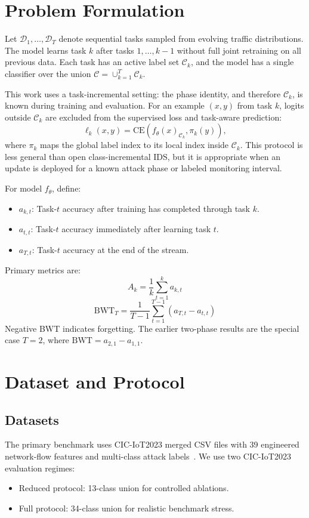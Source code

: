 \documentclass[a4paper,fleqn]{cas-dc}
\begin{document}
\section{Problem Formulation}
Let $\mathcal{D}_1,\ldots,\mathcal{D}_T$ denote sequential tasks sampled from evolving traffic distributions. The model learns task $k$ after tasks $1,\ldots,k-1$ without full joint retraining on all previous data. Each task has an active label set $\mathcal{C}_k$, and the model has a single classifier over the union $\mathcal{C}=\cup_{k=1}^{T}\mathcal{C}_k$.

This work uses a task-incremental setting: the phase identity, and therefore $\mathcal{C}_k$, is known during training and evaluation. For an example $(x,y)$ from task $k$, logits outside $\mathcal{C}_k$ are excluded from the supervised loss and task-aware prediction:
\begin{equation}
\ell_k(x,y)=\text{CE}(f_\theta(x)_{\mathcal{C}_k}, \pi_k(y)),
\end{equation}
where $\pi_k$ maps the global label index to its local index inside $\mathcal{C}_k$. This protocol is less general than open class-incremental IDS, but it is appropriate when an update is deployed for a known attack phase or labeled monitoring interval.

For model $f_\theta$, define:
\begin{itemize}
\item $a_{k,t}$: Task-$t$ accuracy after training has completed through task $k$.
\item $a_{t,t}$: Task-$t$ accuracy immediately after learning task $t$.
\item $a_{T,t}$: Task-$t$ accuracy at the end of the stream.
\end{itemize}

Primary metrics are:
\begin{equation}
A_k = \frac{1}{k}\sum_{t=1}^{k} a_{k,t}
\end{equation}
\begin{equation}
\text{BWT}_T = \frac{1}{T-1}\sum_{t=1}^{T-1}(a_{T,t}-a_{t,t})
\end{equation}
Negative BWT indicates forgetting. The earlier two-phase results are the special case $T=2$, where $\text{BWT}=a_{2,1}-a_{1,1}$.

\section{Dataset and Protocol}
\subsection{Datasets}
The primary benchmark uses CIC-IoT2023 merged CSV files with 39 engineered network-flow features and multi-class attack labels~\cite{ciciot2023}. We use two CIC-IoT2023 evaluation regimes:
\begin{itemize}
\item Reduced protocol: 13-class union for controlled ablations.
\item Full protocol: 34-class union for realistic benchmark stress.
\end{itemize}
\end{document}
